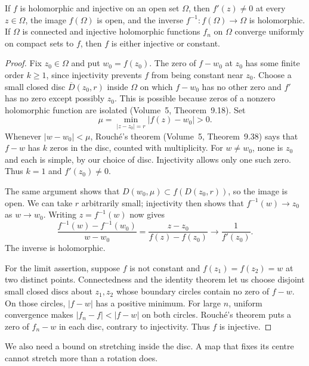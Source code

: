 \begin{lemma}\label{lem:injective}
If $f$ is holomorphic and injective on an open set $\Omega$, then
$f'(z)\ne0$ at every $z\in\Omega$, the image $f(\Omega)$ is open, and the
inverse $f^{-1}:f(\Omega)\to\Omega$ is holomorphic.
If $\Omega$ is connected and injective holomorphic functions $f_n$ on
$\Omega$ converge uniformly on compact sets to $f$, then $f$ is either
injective or constant.
\end{lemma}
\begin{proof}
Fix $z_0\in\Omega$ and put $w_0=f(z_0)$. The zero of $f-w_0$ at $z_0$
has some finite order $k\ge1$, since injectivity prevents $f$ from being
constant near $z_0$. Choose a small closed disc $\overline D(z_0,r)$ inside
$\Omega$ on which $f-w_0$ has no other zero and $f'$ has no zero except
possibly $z_0$. This is possible because zeros of a nonzero holomorphic
function are isolated (Volume~5, Theorem~9.18).
Set
\[
 \mu=\min_{|z-z_0|=r}|f(z)-w_0|>0.
\]
Whenever $|w-w_0|<\mu$, Rouch\'e's theorem (Volume~5, Theorem~9.38)
says that $f-w$ has $k$ zeros in the disc, counted with multiplicity.
For $w\ne w_0$, none is $z_0$ and each is simple, by our choice of disc.
Injectivity allows only one such zero. Thus $k=1$ and $f'(z_0)\ne0$.

The same argument shows that $D(w_0,\mu)\subset f(D(z_0,r))$, so the
image is open. We can take $r$ arbitrarily small; injectivity then shows
that $f^{-1}(w)\to z_0$ as $w\to w_0$. Writing $z=f^{-1}(w)$ now gives
\[
 \frac{f^{-1}(w)-f^{-1}(w_0)}{w-w_0}
 =\frac{z-z_0}{f(z)-f(z_0)}\longrightarrow\frac1{f'(z_0)}.
\]
The inverse is holomorphic.

For the limit assertion, suppose $f$ is not constant and
$f(z_1)=f(z_2)=w$ at two distinct points. Connectedness and the identity
theorem let us choose disjoint small closed discs about $z_1,z_2$ whose
boundary circles contain no zero of $f-w$. On those circles, $|f-w|$
has a positive minimum. For large $n$, uniform convergence makes
$|f_n-f|<|f-w|$ on both circles. Rouch\'e's theorem puts a zero of
$f_n-w$ in each disc, contrary to injectivity. Thus $f$ is injective.
\end{proof}

We also need a bound on stretching inside the disc. A map that fixes its
centre cannot stretch more than a rotation does.

